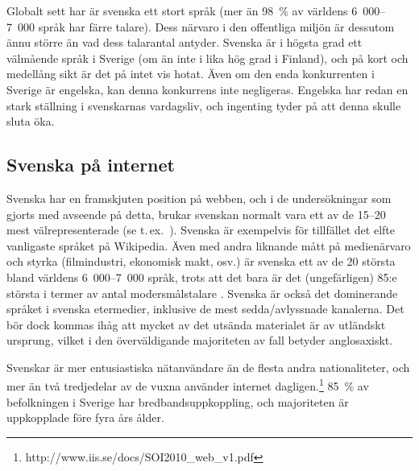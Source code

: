 \begin{multicols}{2}
Globalt sett har är svenska ett stort språk (mer än 98~\% av världens
6~000--7~000 språk har färre talare). Dess närvaro i den offentliga
miljön är dessutom ännu större än vad dess talarantal antyder. Svenska
är i högsta grad ett välmående språk i Sverige (om än inte i lika hög
grad i Finland), och på kort och medellång sikt är det på intet vis
hotat. Även om den enda konkurrenten i Sverige är engelska, kan denna
konkurrens inte negligeras. Engelska har redan en stark ställning i
svenskarnas vardagsliv, och ingenting tyder på att denna skulle sluta
öka.

\subsection{Svenska på internet}

Svenska har en framskjuten position på webben, och i de undersökningar
som gjorts med avseende på detta, brukar svenskan normalt vara ett av
de 15--20 mest välrepresenterade (se
t.\,ex.~\cite[63]{parkvall2006}). Svenska är exempelvis för tillfället
det elfte vanligaste språket på Wikipedia. Även med andra liknande
mått på medienärvaro och styrka (filmindustri, ekonomisk makt, osv.)
är svenska ett av de 20 största bland världens 6~000--7~000 språk,
trots att det bara är det (ungefärligen) 85:e största i termer av
antal modersmålstalare \cite[55--64]{parkvall2006}. Svenska är också
det dominerande språket i svenska etermedier, inklusive de mest
sedda/avlyssnade kanalerna. Det bör dock kommas ihåg att mycket av det
utsända materialet är av utländskt ursprung, vilket i den
överväldigande majoriteten av fall betyder anglosaxiskt.


Svenskar är mer entusiastiska nätanvändare än de flesta andra
nationaliteter, och mer än två tredjedelar av de vuxna använder
internet dagligen.\footnote{http://www.iis.se/docs/SOI2010\_web\_v1.pdf
} 85~\% av befolkningen i Sverige har bredbandsuppkoppling, och
majoriteten är uppkopplade före fyra års ålder.

\end{multicols}

\clearpage




